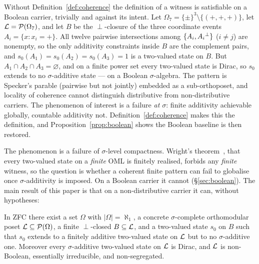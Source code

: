 \begin{remark}\label{rem:amendment}
Without Definition~\ref{def:coherence} the definition of a witness is satisfiable
on a Boolean carrier, trivially and against its intent. Let
$\Omega_7 = \{\pm\}^3\setminus\{(+,+,+)\}$, let $\mathcal{L}=\mathcal{P}(\Omega_7)$, and let $B$ be
the $\perp$-closure of the three coordinate events $A_i=\{x : x_i = +\}$. All twelve
pairwise intersections among $\{A_i, A_i{}^{\perp}\}$ ($i\neq j$) are nonempty, so the only
additivity constraints inside $B$ are the complement pairs, and $s_0(A_1)=s_0(A_2)=s_0(A_3)=1$
is a two-valued state on $B$. But $A_1\cap A_2\cap A_3=\varnothing$, and on a finite
power set every two-valued state is Dirac, so $s_0$ extends to no $\sigma$-additive
state --- on a Boolean $\sigma$-algebra. The pattern is Specker's parable
(pairwise but not jointly) embedded as a sub-orthoposet, and locality of
coherence cannot distinguish distributive from non-distributive carriers.
The phenomenon of interest is a failure \emph{at $\sigma$}: finite additivity
achievable globally, countable additivity not. Definition~\ref{def:coherence}
makes this the definition, and Proposition~\ref{prop:boolean} shows the Boolean
baseline is then restored.
\end{remark}

The phenomenon is a failure of $\sigma$-level compactness. Wright's
theorem~\cite{Wright1978}, that every two-valued state on a \emph{finite} OML is
finitely realised, forbids any \emph{finite} witness, so the question is whether
a coherent finite pattern can fail to globalise once $\sigma$-additivity is imposed.
On a Boolean carrier it cannot (\S\ref{sec:boolean}). The main result of this
paper is that on a non-distributive carrier it can, without hypotheses:

\begin{theorem}\label{thm:main-intro}
In ZFC there exist a set $\Omega$ with $|\Omega|=\aleph_1$, a concrete
$\sigma$-complete orthomodular poset $\mathcal{L}\subseteq\mathcal{P}(\Omega)$, a finite
$\perp$-closed $B\subseteq\mathcal{L}$, and a two-valued state $s_0$ on $B$ such that
$s_0$ extends to a finitely additive two-valued state on $\mathcal{L}$ but to no
$\sigma$-additive one. Moreover every $\sigma$-additive two-valued state on
$\mathcal{L}$ is Dirac, and $\mathcal{L}$ is non-Boolean, essentially irreducible, and
non-segregated.
\end{theorem}

